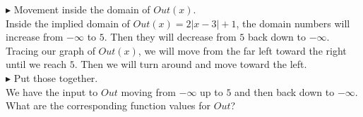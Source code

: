 \documentclass{ximera}
\begin{document}
\textbf{\textcolor{blue!75!black}{$\blacktriangleright$}}  Movement inside the domain of $Out(x)$.\\



Inside the implied domain of $Out(x) =2|x-3|+1$, the domain numbers will increase from $-\infty$ to $5$.  Then they will decrease from $5$ back down to $-\infty$. \\

Tracing our graph of $Out(x)$, we will move from the far left toward the right until we reach $5$.  Then we will turn around and move toward the left.\\



\textbf{\textcolor{blue!75!black}{$\blacktriangleright$}}  Put those together. \\



We have the input to $Out$ moving from $-\infty$ up to $5$ and then back down to $-\infty$.  What are the corresponding function values for $Out$?
\end{document}
